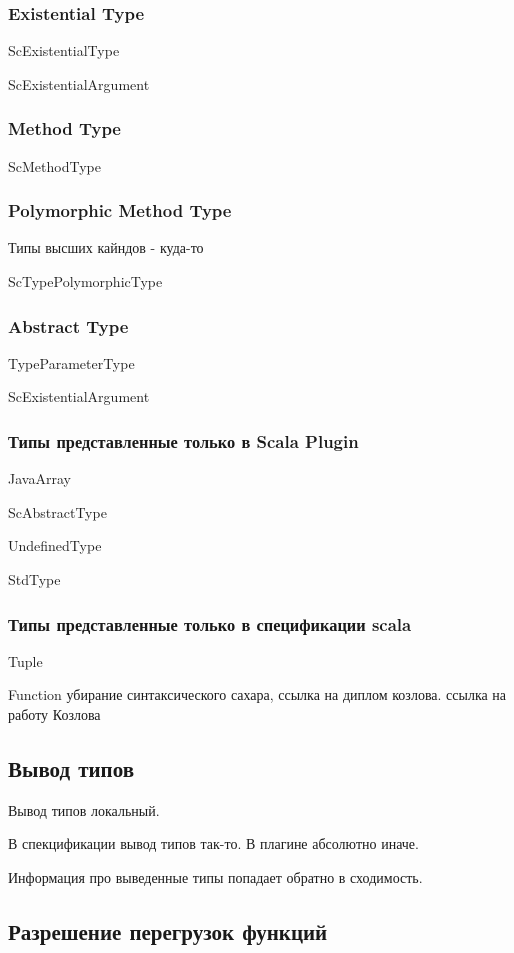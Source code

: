 \subsubsection{Existential Type}

ScExistentialType

ScExistentialArgument

\subsubsection{Method Type}

ScMethodType

\subsubsection{Polymorphic Method Type}
Типы высших кайндов - куда-то

ScTypePolymorphicType


\subsubsection{Abstract Type}

TypeParameterType

ScExistentialArgument

\subsubsection{Типы представленные только в Scala Plugin}
JavaArray

ScAbstractType

UndefinedType

StdType
\subsubsection{Типы представленные только в спецификации scala}
Tuple

Function
убирание синтаксического сахара, ссылка на диплом козлова.
ссылка на работу Козлова


\subsection{Вывод типов}
\label{sec:infer}

Вывод типов локальный.

В спекцификации вывод типов так-то.
В плагине абсолютно иначе.

Информация про выведенные типы попадает обратно в сходимость.

\subsection{Разрешение перегрузок функций}
\label{sec:overloading}
